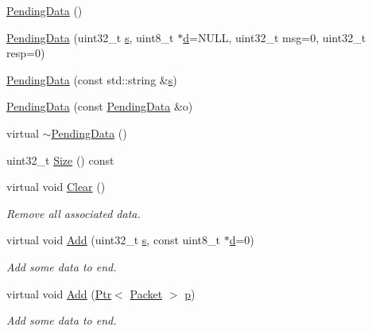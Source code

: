 \begin{DoxyCompactItemize}
\item 
\hyperlink{classns3_1_1PendingData_a9ab4d187b0d38d40769d61979228ff06}{Pending\+Data} ()
\item 
\hyperlink{classns3_1_1PendingData_aa315dec685c4a93dc234b30c7b91d5fd}{Pending\+Data} (uint32\+\_\+t \hyperlink{generate__test__data__lte__sinr_8m_ad83eeb3a142285d1243a08c6b7026df8}{s}, uint8\+\_\+t $\ast$\hyperlink{lte__pathloss_8m_a1aabac6d068eef6a7bad3fdf50a05cc8}{d}=N\+U\+LL, uint32\+\_\+t msg=0, uint32\+\_\+t resp=0)
\item 
\hyperlink{classns3_1_1PendingData_a668e0c4c59a7191850ff64298df86b84}{Pending\+Data} (const std\+::string \&\hyperlink{generate__test__data__lte__sinr_8m_ad83eeb3a142285d1243a08c6b7026df8}{s})
\item 
\hyperlink{classns3_1_1PendingData_ab7b46ebf4baf2c6b165c90b44bfdad4a}{Pending\+Data} (const \hyperlink{classns3_1_1PendingData}{Pending\+Data} \&o)
\item 
virtual \hyperlink{classns3_1_1PendingData_a4fd68ff8a8f47bcc7c32fc4b7d0e0659}{$\sim$\+Pending\+Data} ()
\item 
uint32\+\_\+t \hyperlink{classns3_1_1PendingData_abbbae5f8a12762f9a85d2ddd5c9c9165}{Size} () const 
\item 
virtual void \hyperlink{classns3_1_1PendingData_a5172e78fb88b0a2a93e320c19411aab8}{Clear} ()
\begin{DoxyCompactList}\small\item\em Remove all associated data. \end{DoxyCompactList}\item 
virtual void \hyperlink{classns3_1_1PendingData_a114edb6c333c7a7d6206d188094d3f8b}{Add} (uint32\+\_\+t \hyperlink{generate__test__data__lte__sinr_8m_ad83eeb3a142285d1243a08c6b7026df8}{s}, const uint8\+\_\+t $\ast$\hyperlink{lte__pathloss_8m_a1aabac6d068eef6a7bad3fdf50a05cc8}{d}=0)
\begin{DoxyCompactList}\small\item\em Add some data to end. \end{DoxyCompactList}\item 
virtual void \hyperlink{classns3_1_1PendingData_a0a11f0988a986b694f5b2f138c3cbddd}{Add} (\hyperlink{classns3_1_1Ptr}{Ptr}$<$ \hyperlink{classns3_1_1Packet}{Packet} $>$ \hyperlink{lte__link__budget__x2__handover__measures_8m_ac9de518908a968428863f829398a4e62}{p})
\begin{DoxyCompactList}\small\item\em Add some data to end. \end{DoxyCompactList}\item 

\end{DoxyCompactItemize}
